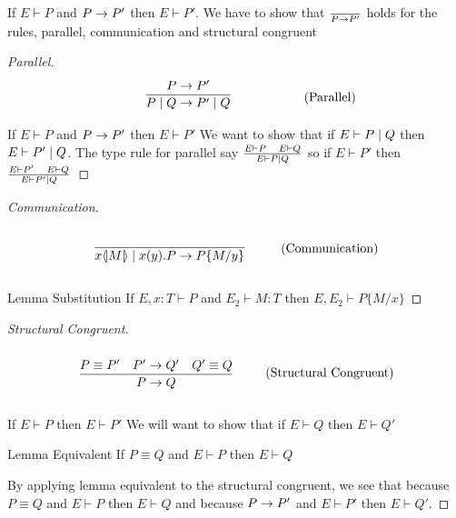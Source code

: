 \begin{theorem}
If \ensuremath{E \vdash P} and \ensuremath{P\ra P'} then \ensuremath{E \vdash P'}.
We have to show that \ensuremath{\frac{}{P \ra P'}} holds for the rules, parallel, communication and structural congruent

\end{theorem}

\begin{proof}[Parallel]
\begin{align*}
    \infrule{P \ra P'}{P \para Q \ra P' \para Q} \tag{Parallel}
\end{align*}
If \ensuremath{E \vdash P} and \ensuremath{P \ra P'} then \ensuremath{E \vdash P'} We want to show that if \ensuremath{E \vdash P \para Q} then \ensuremath{E \vdash P' \para Q}. The type rule for parallel say \ensuremath{\frac{E \vdash P\quad E \vdash Q}{E \vdash P \para Q}} so if \ensuremath{E \vdash P'} then \ensuremath{\frac{E \vdash P' \quad E \vdash Q}{E \vdash P' \para Q}}
\end{proof}

\begin{proof}[Communication]
\begin{align*}
    \infrule{}{\lift{x}{M}\para\inp{x}{y}P\ra P\{M/y\}} \tag{Communication}
\end{align*}

Lemma Substitution
If \ensuremath{E,x:T \vdash P} and \ensuremath{E_2 \vdash M:T} then \ensuremath{E, E_2 \vdash P\{M/x \}}

\end{proof}

\begin{proof}[Structural Congruent]
\begin{align*}
    \infrule{P \equiv P' \quad P' \ra Q' \quad Q' \equiv Q}{P \ra Q} \tag{Structural Congruent}
\end{align*}

If \ensuremath{E \vdash P} then \ensuremath{E \vdash P'} We will want to show that if \ensuremath{E \vdash Q} then \ensuremath{E \vdash Q'}

Lemma Equivalent
If \ensuremath{P \equiv Q} and \ensuremath{E \vdash P} then \ensuremath{E \vdash Q}

By applying lemma equivalent to the structural congruent, we see that because \ensuremath{P \equiv Q} and \ensuremath{E \vdash P} then \ensuremath{E \vdash Q} and because \ensuremath{P \ra P'} and \ensuremath{E \vdash P'} then \ensuremath{E \vdash Q'}.
\end{proof}

